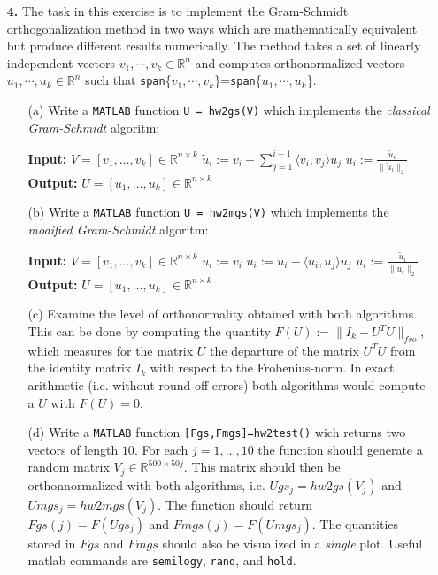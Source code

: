 \documentclass[10pt]{report}
\begin{document}
\begin{enumerate}
\vspace{0.7cm}

  \item[\textbf{4.}] The task in this exercise is to implement the Gram-Schmidt
  orthogonalization method in two ways which are mathematically equivalent but
  produce different results numerically. The method takes a set of linearly
  independent vectors $v_1,\cdots,v_k\in\mathbb{R}^n$ and computes
  orthonormalized vectors $u_1,\cdots,u_k\in\mathbb{R}^n$ such that 
  \verb+span+\{$v_1,\cdots,v_k$\}=\verb+span+\{$u_1,\cdots,u_k$\}. 
  \begin{enumerate}

    \item[(a)] Write a \verb+MATLAB+ function \verb+U = hw2gs(V)+ which
    implements the \textit{classical Gram-Schmidt} algoritm:
    \begin{algorithmic}
    \State \textbf{Input:} $V=[v_1,\ldots,v_k]\in\mathbb{R}^{n\times k}$ 
    \State $\tilde{u}_i:=v_i-\sum_{j=1}^{i-1}\langle v_i,v_j\rangle u_j$ 
    \State $u_i:=\frac{\tilde{u}_i}{\|\tilde{u}_i\|_2}$
    \EndFor
    \State \textbf{Output:} $U=[u_1,\ldots,u_k]\in\mathbb{R}^{n\times k}$ 
    \end{algorithmic}

    \item[(b)] Write a \verb+MATLAB+ function \verb+U = hw2mgs(V)+ which
    implements the \textit{modified Gram-Schmidt} algoritm:
    \begin{algorithmic}
    \State \textbf{Input:} $V=[v_1,\ldots,v_k]\in\mathbb{R}^{n\times k}$ 
    \State $\tilde{u}_i:=v_i$
    \State $\tilde{u}_i:=\tilde{u}_i-\langle \tilde{u}_i,u_j\rangle u_j$ 
    \EndFor
    \State $u_i:=\frac{\tilde{u}_i}{\|\tilde{u}_i\|_2}$
    \EndFor
    \State \textbf{Output:} $U=[u_1,\ldots,u_k]\in\mathbb{R}^{n\times k}$ 
    \end{algorithmic}
          
    \item[(c)] Examine the level of orthonormality obtained with both
    algorithms.
    This can be done by computing the quantity $F(U):=\|I_k-U^TU\|_{fro}$, which
    measures for the matrix $U$ the departure of the matrix $U^TU$ from the
    identity matrix $I_k$ with respect to the Frobenius-norm. In exact
    arithmetic (i.e. without round-off errors) both algorithms would compute
    a $U$ with $F(U)=0$.

    \item[(d)] Write a \verb+MATLAB+ function \verb+[Fgs,Fmgs]=hw2test()+ wich
    returns two vectors of length $10$. For each $j=1,\ldots,10$ the function
    should generate a random matrix $V_j\in\mathbb{R}^{500\times50j}$. This
    matrix should then be orthonnormalized with both algorithms, i.e.
    $Ugs_j=hw2gs(V_j)$ and $Umgs_j=hw2mgs(V_j)$. The function should return
    $Fgs(j)=F(Ugs_j)$ and $Fmgs(j)=F(Umgs_j)$. The quantities stored in $Fgs$
    and $Fmgs$ should also be visualized in a \textit{single} plot. Useful
    matlab commands are \verb+semilogy+, \verb+rand+, and \verb+hold+.


\end{enumerate}
\end{enumerate}
\end{document}
